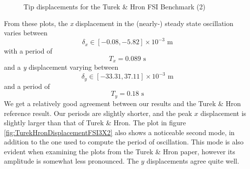 \documentclass{article}
\begin{document}
\begin{enumerate}
\begin{figure}[ht]
        \centering
        \caption{Tip displacements for the Turek \& Hron FSI Benchmark (2)}
\end{figure}
From these plots, the \emph{x} displacement in the (nearly-) steady state oscillation varies between
\[ \delta_x \in [-0.08,-5.82] \times 10^{-3} \mbox{ m} \]
with a period of
\[ T_x = 0.089 \mbox { s} \]
and a \emph{y} displacement varying between
\[ \delta_y \in [-33.31 ,37.11] \times 10^{-3} \mbox{ m} \]
and a period of
\[ T_y = 0.18 \mbox{ s} \]
We get a relatively good agreement between our results and the Turek \& Hron reference result.  
Our periods are slightly shorter, and the peak $x$ displacement is slightly larger than that of  Turek \& Hron.  
The plot in figure \ref{fig:TurekHronDisplacementFSI3X2} also shows a noticeable second mode, in addition to the one used to compute the period of oscillation.  
This mode is also evident when examining the plots from the  Turek \& Hron paper, however its amplitude is somewhat less pronounced.
The $y$ displacements agree quite well.  
\end{enumerate}
\end{document}
